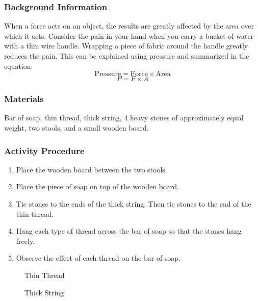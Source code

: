 \subsubsection*{Background Information}
When a force acts on an object, the results are greatly affected by the area over which it acts. Consider the pain in your hand when you carry a bucket of water with a thin wire handle. Wrapping a piece of fabric around the handle greatly reduces the pain. This can be explained using pressure and summarized in the equation:
$$\mathrm{Pressure} = \mathrm{Force} \times \mathrm{Area}$$
$$P=F\times A$$

\subsubsection*{Materials}
Bar of soap, thin thread, thick string, 4 heavy stones of approximately equal weight, two stools, and a small wooden board.

\subsubsection*{Activity Procedure}
\begin{enumerate}
\item{Place the wooden board between the two stools.}
\item{Place the piece of soap on top of the wooden board. }
\item{Tie stones to the ends of the thick string. Then tie stones to the end of the thin thread.} 
\item{Hang each type of thread across the bar of soap so that the stones hang freely.} 
\item{Observe the effect of each thread on the bar of soap.} 
\end{enumerate}

\begin{figure}
\begin{center}
\def\svgwidth{150pt}

\caption{Thin Thread}
\label{fig:pressure-solid1}
\end{center}
\end{figure}

\begin{figure}
\begin{center}
\def\svgwidth{150pt}

\caption{Thick String}
\label{fig:pressure-solid2}
\end{center}
\end{figure}

